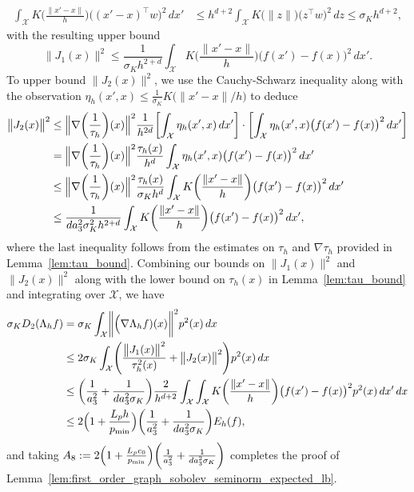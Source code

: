 \documentclass[twoside]{article}
\newcommand{\1}{\mathbf{1}}
\newcommand{\Xset}{\mathcal{X}}
\theoremstyle{definition}
\theoremstyle{remark}
\begin{document}
\begin{align*}
\int_{\Xset}K\biggl(\frac{\|x' - x\|}{h}\biggr)\bigl((x' - x)^{\top} w\bigr)^2\,dx' & \leq h^{d + 2} \int_{\Xset} K\bigl(\|z\|\bigr) \bigl(z^{\top} w\bigr)^2 \,dz \leq \sigma_K h^{d + 2},
\end{align*}
with the resulting upper bound
\begin{equation*}
\bigl\|J_1(x)\bigr\|^2 \leq \frac{1}{\sigma_K h^{2 + d}} \int_{\Xset}K\biggl(\frac{\|x' - x\|}{h}\biggr)\bigl(f(x') - f(x)\bigr)^2\,dx'.
\end{equation*}
To upper bound $\bigl\|J_2(x)\bigr\|^2$, we use the Cauchy-Schwarz inequality along with the observation $\eta_h(x',x) \leq \frac{1}{\sigma_K} K\bigl(\|x' - x\|/h\bigr)$ to deduce
\begin{align*}
\bigl\|J_2(x)\bigr\|^2 & \leq \Bigl\|\nabla\biggl(\frac{1}{\tau_h}\biggr)(x)\Bigr\|^2\frac{1}{h^{2d}} \biggl[\int_{\Xset}\eta_h(x',x) \,dx'\biggr] \cdot \biggl[\int_{\Xset} \eta_h(x',x)\bigl(f(x') - f(x)\bigr)^2 \,dx' \biggr] \\
& = \Bigl\|\nabla\biggl(\frac{1}{\tau_h}\biggr)(x)\Bigr\|^2\frac{\tau_h(x)}{h^d} \int_{\Xset} \eta_h(x',x)\bigl(f(x') - f(x)\bigr)^2 \,dx'\\ 
& \leq \Bigl\|\nabla\biggl(\frac{1}{\tau_h}\biggr)(x)\Bigr\|^2\frac{\tau_h(x)}{\sigma_K h^d}\int_{\Xset} K\biggl(\frac{\|x' - x\|}{h}\biggr)\bigl(f(x') - f(x)\bigr)^2 \,dx' \\
& \leq \frac{1}{da_3^2\sigma_K^2h^{2 + d}} \int_{\Xset} K\biggl(\frac{\|x' - x\|}{h}\biggr)\bigl(f(x') - f(x)\bigr)^2 \,dx',
\end{align*}
where the last inequality follows from the estimates on $\tau_h$ and $\nabla \tau_h$ provided in Lemma~\ref{lem:tau_bound}. Combining our bounds on $\bigl\|J_1(x)\bigr\|^2$ and $\bigl\|J_2(x)\bigr\|^2$ along with the lower bound on $\tau_h(x)$ in Lemma~\ref{lem:tau_bound} and integrating over $\Xset$, we have
\begin{align*}
\sigma_K D_2(\Lambda_h f) & = \sigma_K\int_{\Xset} \biggl\|\Bigl(\nabla \Lambda_hf)(x)\biggr\|^2 p^2(x) \,dx \\
& \leq 2 \sigma_K \int_{\Xset} \Biggl(\frac{\bigl\|J_1(x)\bigr\|^2}{\tau_h^2(x)} + \bigl\|J_2(x)\bigr\|^2\Biggr) p^2(x) \,dx \\
& \leq \biggl(\frac{1}{a_3^2} + \frac{1}{da_3^2\sigma_K}\biggr)\frac{2}{h^{d + 2}} \int_{\Xset} \int_{\Xset} K\biggl(\frac{\|x' - x\|}{h}\biggr)\bigl(f(x') - f(x)\bigr)^2 p^2(x) \,dx' \,dx \\
& \leq 2 \Bigl(1 + \frac{L_ph}{p_{\min}}\Bigr) \biggl(\frac{1}{a_3^2} + \frac{1}{da_3^2\sigma_K}\biggr) E_h(f),
\end{align*}
and taking $A_8 := 2 \Bigl(1 + \frac{L_pc_0}{p_{\min}}\Bigr) \biggl(\frac{1}{a_3^2} + \frac{1}{da_3^2\sigma_K}\biggr)$ completes the proof of Lemma~\ref{lem:first_order_graph_sobolev_seminorm_expected_lb}. 
\end{document}
